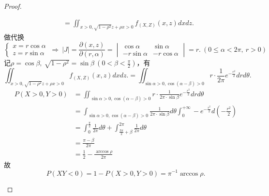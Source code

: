 \documentclass{article}
\begin{document}
\begin{proof}
\begin{enumerate}
\begin{align*}
            & = \iint_{x>0, \sqrt{1-\rho^2} z + \rho x >0}  f_{(X,Z)}(x,z) dx dz.
        \end{align*}
        做代换
        \[
            \begin{cases}
                x = r \cos \alpha\\
                z = r \sin \alpha
            \end{cases} 
            \ \Rightarrow\ 
            |J|
            = \frac{\partial(x,z)}{\partial(r,\alpha)} 
            = 
            \begin{vmatrix}
                \cos \alpha & \sin \alpha\\
                -r\sin \alpha & -r \cos \alpha    
            \end{vmatrix}  
            = r.
            \ (0\leq \alpha <2\pi ,\ r>0)
        \]
        记$\rho = \cos \beta ,\ \sqrt{1- \rho^2} = \sin \beta \ (0<\beta <\frac{\pi}{2})$，有
        \[
            \iint_{x>0, \sqrt{1-\rho^2} z + \rho x >0}  f_{(X,Z)}(x,z) dx dz.
            = 
            \iint_{\sin \alpha >0, \cos (\alpha - \beta) > 0} r\cdot \frac{1}{2\pi} e^{-\frac{r^2}{2}}   dr d\theta .
        \]
        \begin{align*}
            P(X>0,Y>0)
            & = \iint_{\sin \alpha >0, \cos (\alpha - \beta) > 0} r\cdot \frac{1}{2\pi \cdot \sin \beta} e^{-\frac{r^2}{2}}   dr d\theta\\
            & = \int_{\sin \alpha >0, \cos (\alpha - \beta) > 0} \frac{1}{2\pi \cdot \sin \beta} d\theta \int_{0}^{+\infty}  -e^{-\frac{r^2}{2}} d(-\frac{r^2}{2})\\
            & = \int_{0}^{\frac{\pi}{2}} \frac{1}{2\pi} d\theta + \int_{\frac{3\pi}{2}+\beta}^{2\pi} \frac{1}{2\pi} d\theta \\
            & = \frac{\pi - \beta}{2\pi}\\
            & = \frac{1}{2} - \frac{\arccos \rho}{2\pi}
        \end{align*}
        故
        \[
            P(XY<0) = 1 - P(X>0, Y>0) = \pi^{-1} \arccos \rho .  
        \]
    \end{enumerate}
\end{proof}
\end{document}
